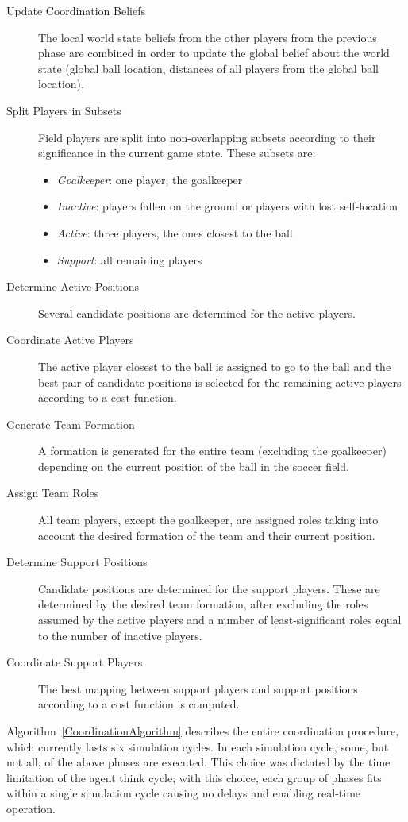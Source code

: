 \begin{description}
\item[Update Coordination Beliefs] The local world state beliefs from the other players from the previous phase are combined in order to update the global belief about the world state (global ball location, distances of all players from the global ball location). 
\item[Split Players in Subsets] Field players are split into non-overlapping subsets according to their significance in the current game state. These subsets are:
\begin{itemize}
\item \textit{Goalkeeper}: one player, the goalkeeper
\item \textit{Inactive}: players fallen on the ground or players with lost self-location
\item \textit{Active}: three players, the ones closest to the ball
\item \textit{Support}: all remaining players
\end{itemize}
\item[Determine Active Positions] Several candidate positions are determined for the active players.
\item[Coordinate Active Players] The active player closest to the ball is assigned to go to the ball and the best pair of candidate positions is selected for the remaining active players according to a cost function.
\item[Generate Team Formation] A formation is generated for the entire team (excluding the goalkeeper) depending on the current position of the ball in the soccer field.
\item[Assign Team Roles] All team players, except the goalkeeper, are assigned roles taking into account the desired  formation of the team and their current position.
\item[Determine Support Positions]  Candidate positions are determined for the support players. These are determined by the desired team formation, after excluding the roles assumed by the active players and a number of least-significant roles equal to the number of inactive players. 
\item[Coordinate Support Players] The best mapping between support players and support positions according to a cost function is computed.
\end{description}
Algorithm~\ref{CoordinationAlgorithm} describes the entire coordination procedure, which currently lasts six simulation cycles. In each simulation cycle, some, but not all, of the above phases are executed. This choice was dictated by the time limitation of the agent think cycle; with this choice, each group of phases fits within a single simulation cycle causing no delays and enabling real-time operation. 

